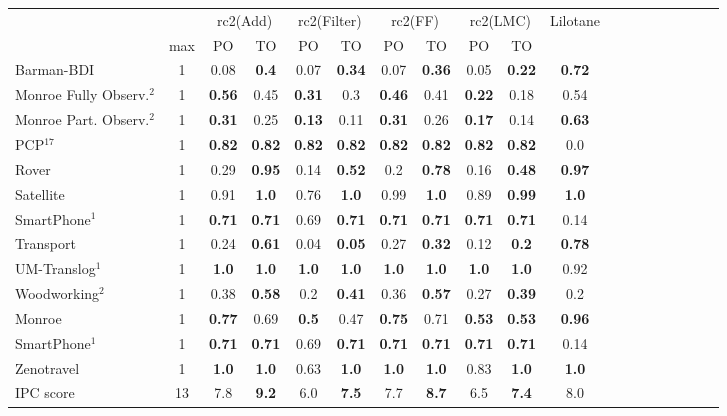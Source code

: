 \begin{tabular}{lccccccccccccccccccl} 
\toprule 
  && \multicolumn{2}{c}{rc2(Add)} & \multicolumn{2}{c}{rc2(Filter)} & \multicolumn{2}{c}{rc2(FF)} & \multicolumn{2}{c}{rc2(LMC)} & \multicolumn{2}{c}{Lilotane} \\ 
\cmidrule(lr){3-4} \cmidrule(lr){5-6} \cmidrule(lr){7-8} \cmidrule(lr){9-10} \cmidrule(lr){11-12}  
 & max &PO & TO & PO & TO & PO & TO & PO &\multicolumn{2}{c}{ TO  } \\ 
\midrule 
Barman-BDI & 1 & 0.08 & \textbf{0.4} & 0.07 & \textbf{0.34} & 0.07 & \textbf{0.36} & 0.05 & \textbf{0.22} &\multicolumn{2}{c}{ \textbf{0.72}  } \\ 
Monroe Fully Observ.$^{2}$ & 1 & \textbf{0.56} & 0.45 & \textbf{0.31} & 0.3 & \textbf{0.46} & 0.41 & \textbf{0.22} & 0.18 &\multicolumn{2}{c}{ 0.54  } \\ 
Monroe Part. Observ.$^{2}$ & 1 & \textbf{0.31} & 0.25 & \textbf{0.13} & 0.11 & \textbf{0.31} & 0.26 & \textbf{0.17} & 0.14 &\multicolumn{2}{c}{ \textbf{0.63}  } \\ 
PCP$^{17}$ & 1 & \textbf{0.82} & \textbf{0.82} & \textbf{0.82} & \textbf{0.82} & \textbf{0.82} & \textbf{0.82} & \textbf{0.82} & \textbf{0.82} &\multicolumn{2}{c}{ 0.0  } \\ 
Rover & 1 & 0.29 & \textbf{0.95} & 0.14 & \textbf{0.52} & 0.2 & \textbf{0.78} & 0.16 & \textbf{0.48} &\multicolumn{2}{c}{ \textbf{0.97}  } \\ 
Satellite & 1 & 0.91 & \textbf{1.0} & 0.76 & \textbf{1.0} & 0.99 & \textbf{1.0} & 0.89 & \textbf{0.99} &\multicolumn{2}{c}{ \textbf{1.0}  } \\ 
SmartPhone$^{1}$ & 1 & \textbf{0.71} & \textbf{0.71} & 0.69 & \textbf{0.71} & \textbf{0.71} & \textbf{0.71} & \textbf{0.71} & \textbf{0.71} &\multicolumn{2}{c}{ 0.14  } \\ 
Transport & 1 & 0.24 & \textbf{0.61} & 0.04 & \textbf{0.05} & 0.27 & \textbf{0.32} & 0.12 & \textbf{0.2} &\multicolumn{2}{c}{ \textbf{0.78}  } \\ 
UM-Translog$^{1}$ & 1 & \textbf{1.0} & \textbf{1.0} & \textbf{1.0} & \textbf{1.0} & \textbf{1.0} & \textbf{1.0} & \textbf{1.0} & \textbf{1.0} &\multicolumn{2}{c}{ 0.92  } \\ 
Woodworking$^{2}$ & 1 & 0.38 & \textbf{0.58} & 0.2 & \textbf{0.41} & 0.36 & \textbf{0.57} & 0.27 & \textbf{0.39} &\multicolumn{2}{c}{ 0.2  } \\ 
\midrule 
Monroe & 1 & \textbf{0.77} & 0.69 & \textbf{0.5} & 0.47 & \textbf{0.75} & 0.71 & \textbf{0.53} & \textbf{0.53} &\multicolumn{2}{c}{ \textbf{0.96}  } \\ 
SmartPhone$^{1}$ & 1 & \textbf{0.71} & \textbf{0.71} & 0.69 & \textbf{0.71} & \textbf{0.71} & \textbf{0.71} & \textbf{0.71} & \textbf{0.71} &\multicolumn{2}{c}{ 0.14  } \\ 
Zenotravel & 1 & \textbf{1.0} & \textbf{1.0} & 0.63 & \textbf{1.0} & \textbf{1.0} & \textbf{1.0} & 0.83 & \textbf{1.0} &\multicolumn{2}{c}{ \textbf{1.0}  } \\ 
\midrule 
IPC score & 13 & 7.8 & \textbf{9.2} & 6.0 & \textbf{7.5} & 7.7 & \textbf{8.7} & 6.5 & \textbf{7.4} &\multicolumn{2}{c}{ 8.0  } \\ 
\bottomrule 
 \end{tabular} 
